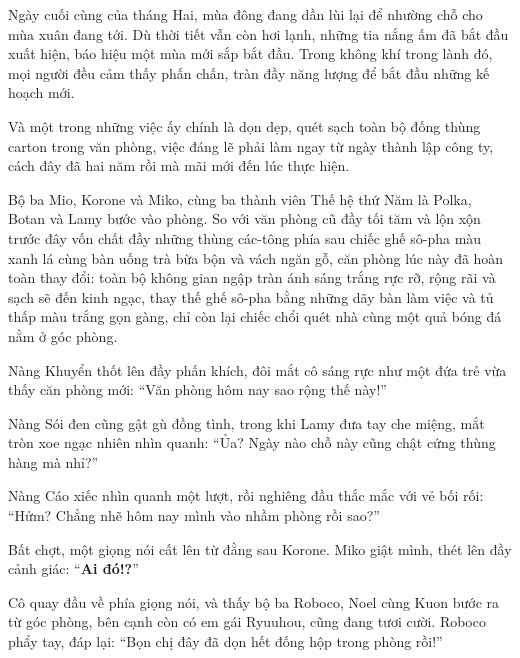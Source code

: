 \documentclass[../main.tex]{subfiles}
\begin{document}

Ngày cuối cùng của tháng Hai, mùa đông đang dần lùi lại để nhường chỗ cho mùa xuân đang tới. Dù thời tiết vẫn còn hơi lạnh, những tia nắng ấm đã bắt đầu xuất hiện, báo hiệu một mùa mới sắp bắt đầu. Trong không khí trong lành đó, mọi người đều cảm thấy phấn chấn, tràn đầy năng lượng để bắt đầu những kế hoạch mới.

Và một trong những việc ấy chính là dọn dẹp, quét sạch toàn bộ đống thùng carton trong văn phòng, việc đáng lẽ phải làm ngay từ ngày thành lập công ty, cách đây đã hai năm rồi mà mãi mới đến lúc thực hiện.

Bộ ba Mio, Korone và Miko, cùng ba thành viên Thế hệ thứ Năm là Polka, Botan và Lamy bước vào phòng. So với văn phòng cũ đầy tối tăm và lộn xộn trước đây vốn chất đầy những thùng các-tông phía sau chiếc ghế sô-pha màu xanh lá cùng bàn uống trà bừa bộn và vách ngăn gỗ, căn phòng lúc này đã hoàn toàn thay đổi: toàn bộ không gian ngập tràn ánh sáng trắng rực rỡ, rộng rãi và sạch sẽ đến kinh ngạc, thay thế ghế sô-pha bằng những dãy bàn làm việc và tủ thấp màu trắng gọn gàng, chỉ còn lại chiếc chổi quét nhà cùng một quả bóng đá nằm ở góc phòng.


Nàng Khuyển thốt lên đầy phấn khích, đôi mắt cô sáng rực như một đứa trẻ vừa thấy căn phòng mới: ``Văn phòng hôm nay sao rộng thế này!''

Nàng Sói đen cũng gật gù đồng tình, trong khi Lamy đưa tay che miệng, mắt tròn xoe ngạc nhiên nhìn quanh: ``Ủa? Ngày nào chỗ này cũng chật cứng thùng hàng mà nhỉ?''

Nàng Cáo xiếc nhìn quanh một lượt, rồi nghiêng đầu thắc mắc với vẻ bối rối: ``Hửm? Chẳng nhẽ hôm nay mình vào nhầm phòng rồi sao?''

Bất chợt, một giọng nói cất lên từ đằng sau Korone. Miko giật mình, thét lên đầy cảnh giác: ``\textbf{Ai đó!?}''

Cô quay đầu về phía giọng nói, và thấy bộ ba Roboco, Noel cùng Kuon bước ra từ góc phòng, bên cạnh còn có em gái Ryuuhou, cũng đang tươi cười. Roboco phẩy tay, đáp lại: ``Bọn chị đây đã dọn hết đống hộp trong phòng rồi!''
\end{document}
